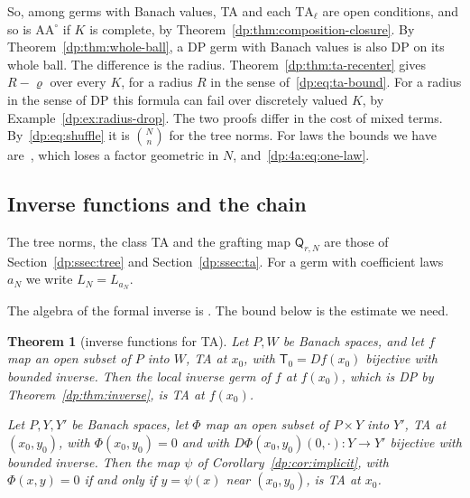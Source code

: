 \documentclass[11pt]{amsart}
\newtheorem{theorem}{Theorem}[section]
\theoremstyle{definition}
\theoremstyle{remark}
\numberwithin{equation}{section}
\theoremstyle{plain}
\theoremstyle{definition}
\theoremstyle{plain}
\begin{document}
So, among germs with Banach values, TA and each $\mathrm{TA}_\ell$ are open conditions, and so is $\mathrm{AA}^\circ$ if $K$ is complete, by Theorem~\ref{dp:thm:composition-closure}. By Theorem~\ref{dp:thm:whole-ball}, a DP germ with Banach values is also DP on its whole ball. The difference is the radius. Theorem~\ref{dp:thm:ta-recenter} gives $R-\varrho$ over every $K$, for a radius $R$ in the sense of~\eqref{dp:eq:ta-bound}. For a radius in the sense of DP this formula can fail over discretely valued $K$, by Example~\ref{dp:ex:radius-drop}. The two proofs differ in the cost of mixed terms. By~\eqref{dp:eq:shuffle} it is $\binom Nn$ for the tree norms. For laws the bounds we have are~\cite[(Q.2)]{I}, which loses a factor geometric in $N$, and~\eqref{dp:4a:eq:one-law}.
\subsection{Inverse functions and the chain}\label{dp:ssec:chain}

The tree norms, the class TA and the grafting map $\mathsf Q_{r,N}$ are those of Section~\ref{dp:ssec:tree} and Section~\ref{dp:ssec:ta}. For a germ with coefficient laws $a_N$ we write $L_N=L_{a_N}$.

The algebra of the formal inverse is \cite[Th.~VI.3, Prop.~VI.8]{Ro}. The bound below is the estimate we need.

\begin{theorem}[inverse functions for TA]\label{dp:thm:ta-inverse}
Let $P,W$ be Banach spaces, and let $f$ map an open subset of $P$ into $W$, TA at $x_0$, with $\mathsf T_0=Df(x_0)$ bijective with bounded inverse. Then the local inverse germ of $f$ at $f(x_0)$, which is DP by Theorem~\ref{dp:thm:inverse}, is TA at $f(x_0)$.

Let $P,Y,Y'$ be Banach spaces, let $\Phi$ map an open subset of $P\times Y$ into $Y'$, TA at $(x_0,y_0)$, with $\Phi(x_0,y_0)=0$ and with $D\Phi(x_0,y_0)(0,\cdot)\colon Y\to Y'$ bijective with bounded inverse. Then the map $\psi$ of Corollary~\ref{dp:cor:implicit}, with $\Phi(x,y)=0$ if and only if $y=\psi(x)$ near $(x_0,y_0)$, is TA at $x_0$.
\end{theorem}
\end{document}

